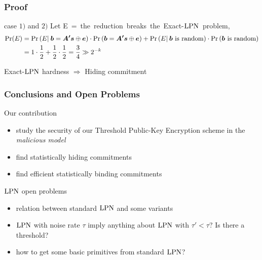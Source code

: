 \begin{frame}
\frametitle{Proof}

  \begin{center}
  \end{center}

  \begin{block}{case $1)$ and $2)$ }
  Let \mbox{E = {the reduction breaks the Exact-$\mathrm{LPN}$ problem}},  
  \begin{align*}
    \Pr(E) &= \Pr \left( E | \:\boldsymbol{b}  = \boldsymbol{A'} \boldsymbol{s} \mathbin{\oplus} \boldsymbol{e}  \right)  \cdot  \Pr \left( \boldsymbol{b}  = \boldsymbol{A'} \boldsymbol{s} \mathbin{\oplus} \boldsymbol{e}  \right)  + \Pr \left( E   | \: \boldsymbol{b} \text{ is random}  \right)   \cdot \Pr \left(   \boldsymbol{b} \text{ is random} \right) \\
	  &=  1  \cdot   \frac{1}{2}  +  \frac{1}{2}  \cdot  \frac{1}{2} = \frac{3}{4} \gg 2^{-k}
  \end{align*}
  \begin{center}   
      \alert{Exact-$\mathrm{LPN}$ hardness $\Rightarrow$ Hiding commitment}
  \end{center}
  \end{block}

\end{frame}

 
\begin{frame}
 \frametitle{Conclusions and Open Problems}
 
 \begin{block}{Our contribution}
\begin{itemize}
 \item study the security of our Threshold Public-Key Encryption scheme in the \emph{malicious model}
 \item find statistically hiding commitments
 \item find efficient statistically binding commitments
\end{itemize}
  
 \end{block}

 \begin{block}{$\mathrm{LPN}$ open problems}
  \begin{itemize}
   \item relation between standard $\mathrm{LPN}$ and some variants
   \item $\mathrm{LPN}$ with noise rate $\tau$ imply anything about $\mathrm{LPN}$ with $\tau' < \tau$? Is there a threshold?
   \item how to get some basic primitives from standard $\mathrm{LPN}$?
  \end{itemize}

 \end{block}
 

\end{frame}
